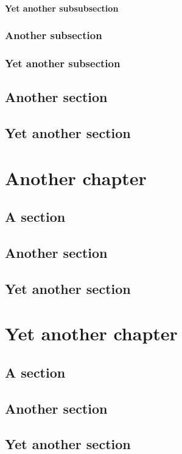 \documentclass{abe}
\begin{document}
\subsubsection{Yet another subsubsection}
\subsection{Another subsection}
\subsection{Yet another subsection}
\section{Another section}
\section{Yet another section}

\chapter{Another chapter}
\section{A section}
\section{Another section}
\section{Yet another section}

\chapter{Yet another chapter}
\section{A section}
\section{Another section}
\section{Yet another section}

\backmatter%



 
\end{document}
